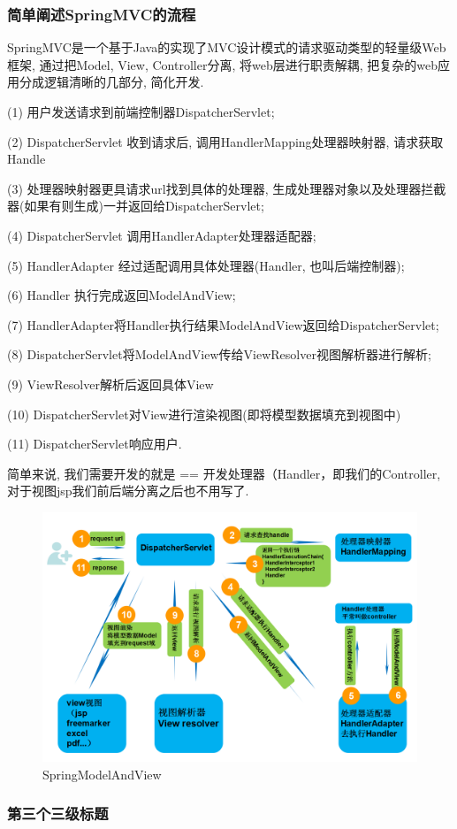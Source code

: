 \documentclass[UTF8]{ctexart}
\begin{document}
\subsubsection{简单阐述SpringMVC的流程}
	SpringMVC是一个基于Java的实现了MVC设计模式的请求驱动类型的轻量级Web框架, 通过把Model, View, Controller分离, 将web层进行职责解耦, 把复杂的web应用分成逻辑清晰的几部分, 简化开发.
\par
(1) 用户发送请求到前端控制器DispatcherServlet;
\par
(2) DispatcherServlet 收到请求后, 调用HandlerMapping处理器映射器, 请求获取Handle
\par
(3) 处理器映射器更具请求url找到具体的处理器, 生成处理器对象以及处理器拦截器(如果有则生成)一并返回给DispatcherServlet;
\par
(4) DispatcherServlet 调用HandlerAdapter处理器适配器;
\par
(5) HandlerAdapter 经过适配调用具体处理器(Handler, 也叫后端控制器);
\par
(6) Handler 执行完成返回ModelAndView;
\par
(7) HandlerAdapter将Handler执行结果ModelAndView返回给DispatcherServlet;
\par
(8) DispatcherServlet将ModelAndView传给ViewResolver视图解析器进行解析;
\par
(9) ViewResolver解析后返回具体View
\par
(10) DispatcherServlet对View进行渲染视图(即将模型数据填充到视图中)
\par
(11) DispatcherServlet响应用户.
\par
简单来说, 我们需要开发的就是 == 开发处理器（Handler，即我们的Controller, 对于视图jsp我们前后端分离之后也不用写了.
\begin{figure}
	\centering
	\includegraphics[width=0.7\linewidth]{figures/SpringModelAndView.png}
	\caption{SpringModelAndView}
	\label{fig:SpringModelAndView}
\end{figure}
	\subsubsection{第三个三级标题}
	
\end{document}
